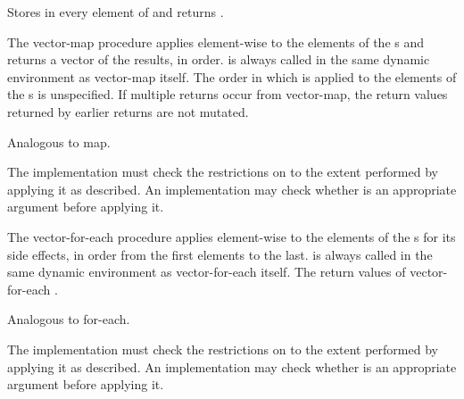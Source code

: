 \begin{entry}{%
}

Stores  in every element of 
and returns \unspecifiedreturn.
\end{entry}

\begin{entry}{%
}


The {\cf vector-map} procedure applies  element-wise to the elements of the
s and returns a vector of the results, in order.
 is always called in the same dynamic environment 
as {\cf vector-map} itself.
The order in which  is applied to the elements of the
s is unspecified.
If multiple returns occur from {\cf vector-map}, the return
values returned by earlier returns are not mutated.


Analogous to {\cf map}.

\implresp The implementation must check the restrictions
on  to the extent performed by applying it as described.
An
implementation may check whether  is an appropriate argument
before applying it.
\end{entry}


\begin{entry}{%
}

The {\cf vector-for-each} procedure applies 
element-wise to the elements of the
s for its side effects,  in order from the first elements to the
last.
 is always called in the same dynamic environment 
as {\cf vector-for-each} itself.
The return values of {\cf vector-for-each} \areunspecified.

Analogous to {\cf for-each}.

\implresp The implementation must check the restrictions
on  to the extent performed by applying it as described.
An
implementation may check whether  is an appropriate argument
before applying it.
\end{entry}

